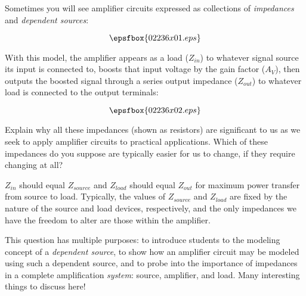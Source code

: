 

Sometimes you will see amplifier circuits expressed as collections of {\it impedances} and {\it dependent sources}:

$$\epsfbox{02236x01.eps}$$

With this model, the amplifier appears as a load ($Z_{in}$) to whatever signal source its input is connected to, boosts that input voltage by the gain factor ($A_V$), then outputs the boosted signal through a series output impedance ($Z_{out}$) to whatever load is connected to the output terminals:

$$\epsfbox{02236x02.eps}$$

Explain why all these impedances (shown as resistors) are significant to us as we seek to apply amplifier circuits to practical applications.  Which of these impedances do you suppose are typically easier for us to change, if they require changing at all?







$Z_{in}$ should equal $Z_{source}$ and $Z_{load}$ should equal $Z_{out}$ for maximum power transfer from source to load.  Typically, the values of $Z_{source}$ and $Z_{load}$ are fixed by the nature of the source and load devices, respectively, and the only impedances we have the freedom to alter are those within the amplifier.







This question has multiple purposes: to introduce students to the modeling concept of a {\it dependent source}, to show how an amplifier circuit may be modeled using such a dependent source, and to probe into the importance of impedances in a complete amplification {\it system}: source, amplifier, and load.  Many interesting things to discuss here!




